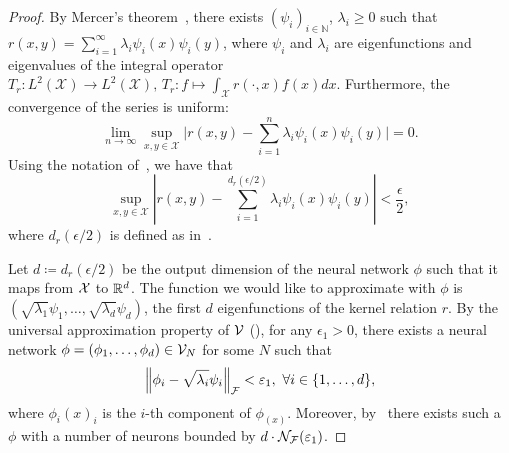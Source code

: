 \begin{proof}
	By Mercer's theorem~\parencite{mercerFunctionsPositive1909, sunMercerTheorem2005, micchelliUniversalKernels2006}, there exists $(\psi_i)_{i \in \mathbb{N}}$, $\lambda_i \geq 0$ such that $r(x,y) = \sum_{i=1}^{\infty}{\lambda_i \psi_i(x) \psi_i(y)}$, where $\psi_i$ and $\lambda_i$ are eigenfunctions and eigenvalues of the integral operator $T_r: L^2(\mathcal{X}) \to L^2(\mathcal{X}),\,T_r: f \mapsto \int_{\mathcal{X}}{r(\cdot, x) f(x) dx}$.
	Furthermore, the convergence of the series is uniform:
	\begin{equation}
		\lim_{n \to \infty} \sup_{x,y \in \mathcal{X}} \lvert r(x,y) - \sum_{i=1}^{n}{\lambda_i \psi_i(x) \psi_i(y) \rvert} = 0.
	\end{equation}
	Using the notation of~, we have that
	\begin{equation}\label{eq:proof_mercer_thm_unif_abs_cv}
		\sup_{x,y \in \mathcal{X}} \left\lvert r(x,y) - \sum_{i=1}^{d_r(\epsilon/2)}{\lambda_i \psi_i(x) \psi_i(y)} \right\rvert < \frac{\epsilon}{2},
	\end{equation}
	where $d_r(\epsilon/2)$ is defined as in~.

	Let $d \coloneqq d_r(\epsilon / 2)$ be the output dimension of the neural network $\phi$ such that it maps from ${\mathcal{X}}$ to $\mathbb{R}^d$. The function we would like to approximate with $\phi$ is $(\sqrt{\lambda_1} \psi_1, \ldots, \sqrt{\lambda_{d}} \psi_{d})$, the first $d$ eigenfunctions of the kernel relation $r$. By the universal approximation property of ${\mathcal{V}}$ (), for any $\epsilon_1 > 0$, there exists a neural network $\phi = (\phi_1, \ldots, \phi_d) \in {\mathcal{V}}_N$ for some $N$ such that
	\begin{equation}\label{eq:proof_NN_UAP}
		\norm{\phi_i - \sqrt{\lambda_i} \psi_i}_\calF < \epsilon_1, \ \forall i \in \{1, \ldots, d\},
	\end{equation}
	where $\phi_i(x)_i$ is the $i$-th component of $\phi_(x)$. Moreover, by~ there exists such a $\phi$ with a number of neurons bounded by $d \cdot {\mathcal{N}}_{\mathcal{F}}(\varepsilon_1)$.


\end{proof}
